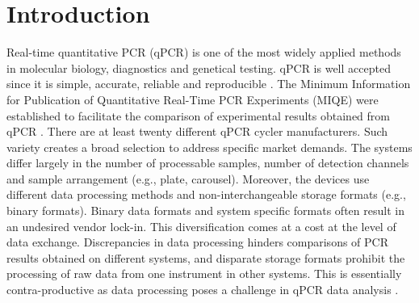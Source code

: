 \documentclass{bioinfo}
\begin{document}
\section{Introduction}
Real-time quantitative PCR (qPCR) is one of the most widely applied methods in molecular 
biology, diagnostics and genetical testing. qPCR is well accepted since 
it is simple, accurate, reliable and reproducible \cite{pabinger_2014}. The 
Minimum Information for Publication of Quantitative Real-Time PCR Experiments (MIQE) were established to facilitate the comparison of experimental results obtained from qPCR 
\cite{huggett_2013}. There are at least twenty different qPCR cycler manufacturers. Such variety creates a broad selection to 
address specific market demands. The systems differ largely in the 
number of processable samples, number of detection channels and sample 
arrangement (e.g., plate, carousel). Moreover, the devices use different 
data processing methods and non-interchangeable storage formats (e.g., binary formats). 
Binary data formats and system specific formats often result in an undesired vendor 
lock-in. This diversification comes at a cost at the level of data 
exchange. Discrepancies in data processing hinders comparisons of PCR results 
obtained on different systems, and disparate storage formats prohibit the processing 
of raw data from one instrument in other systems. This is essentially contra-productive as data processing poses a 
challenge in qPCR data analysis \cite{bustin_reproducibility_2014, roediger2015r, 
spiess_impact_2014, spiess_system-specific_2016}.
\end{document}
